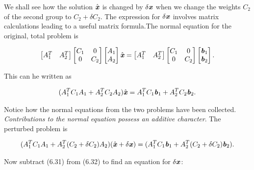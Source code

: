 We shall see how the solution $\hat{\textbf{\textit{x}}}$ is changed by $ \delta \textbf{\textit{x}} $ when we change the weights $C_{2}$ of the second group to $ C_{2}+\delta C_{2}$. The expression for $ \delta \textbf{\textit{x}}$ involves matrix calculations leading to a useful matrix formula.The normal equation for the original, total problem is

\begin{align*}
\begin{bmatrix}
A^{T}_{1} &	A^{T}_{2}
\end{bmatrix}
\begin{bmatrix}
C_{1} &	0 \\
0     &	C_{2}
\end{bmatrix}
\begin{bmatrix}
A_{1} \\
A_{2}
\end{bmatrix}  \hat{\textbf{\textit{x}}} = 
\begin{bmatrix}
A^{T}_{1} &	A^{T}_{2}
\end{bmatrix}
\begin{bmatrix}
C_{1} &	0 \\
0     &	C_{2}
\end{bmatrix}
\begin{bmatrix}
\textbf{\textit{b}}_{1} \\
\textbf{\textit{b}}_{2}
\end{bmatrix}.
\end{align*}
\begin{flushleft}
	This can he written as
\end{flushleft}
\begin{align}
(A^{T}_{1}C_{1}A_{1}+A^{T}_{2}C_{2}A_{2})\hat{\textbf{\textit{x}}}=A^{T}_{1}C_{1}\textbf{\textit{b}}_{1}+A^{T}_{2}C_{2}\textbf{\textit{b}}_{2}.
\end{align}
\begin{flushleft}
	Notice how the normal equations from the two problems have been collected. \textit{Contributions to the normal equation possess an additive character}. The perturbed problem is
\end{flushleft}
\begin{align}
(A^{T}_{1}C_{1}A_{1}+A^{T}_{2}(C_{2}+\delta C_{2} )A_{2})(\hat{\textbf{\textit{x}}}+\delta \textbf{\textit{x}} )=(A^{T}_{1}C_{1}\textbf{\textit{b}}_{1}+A^{T}_{2}(C_{2}+\delta C_{2} )\textbf{\textit{b}}_{2}).
\end{align}
\begin{flushleft}
	Now subtract (6.31) from (6.32) to find an equation for $ \delta \textbf{\textit{x}} $:
\end{flushleft}
